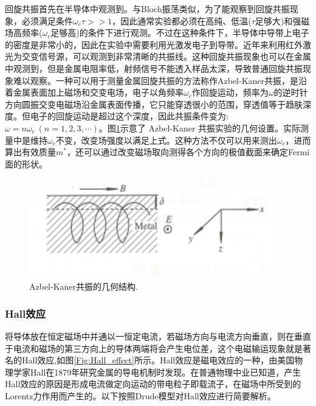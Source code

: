 回旋共振首先在半导体中观测到。与Bloch振荡类似，为了能观察到回旋共振现象，必须满足条件$\omega_c\tau>>1$，因此通常实验都必须在高纯、低温($\tau$足够大)和强磁场高频率($\omega_c$足够高)的条件下进行观测。不过在这种条件下，半导体中导带上电子的密度是非常小的，因此在实验中需要利用光激发电子到导带。近年来利用红外激光为交变信号源，可以观测到非常清晰的共振线。这种回旋共振现象也可以在金属中观测到，但是金属电阻率低，射频信号不能透入样品太深，导致普通回旋共振现象难以观察。一种可以用于测量金属回旋共振的方法称作Azbel-Kaner共振，是沿着金属表面加上磁场和交变电场，电子以角频率$\omega_c$作回旋运动，频率为$\omega$的逆时针方向圆振交变电磁场沿金属表面传播，它只能穿透很小的范围，穿透值等于趋肤深度。但电子的回旋运动是超过这个深度，因此共振条件变为:$\omega=n\omega_c~(n=1,2,3,\cdots)$。图\ref{Fig:Azbel-Kaner}示意了 Azbel-Kaner 共振实验的几何设置。实际测量中是维持$\omega_c$不变，改变场强度以满足上式。这种方法不仅可以用来测出$\omega_c$，进而算出有效质量$m^{\ast}$，还可以通过改变磁场取向测得各个方向的极值截面来确定Fermi面的形状。
\begin{figure}[h!]
\centering
\vspace*{-0.10in}
\includegraphics[height=1.70in,width=4.20in,viewport=0 0 65 25,clip]{Figures/Azbel-Kaner.png}
\caption{\small \textrm{Azbel-Kaner共振的几何结构.}}%
\label{Fig:Azbel-Kaner}
\end{figure}


\subsubsection{Hall效应} 
将导体放在恒定磁场中并通以一恒定电流，若磁场方向与电流方向垂直，则在垂直于电流和磁场的第三方向上的导体两端将会产生电位差，这个电磁输运现象就是著名的Hall效应,如图\ref{Fig:Hall_effect}所示。Hall效应是磁电效应的一种，由美国物理学家Hall在1879年研究金属的导电机制时发现。在普通物理中业已知道，产生Hall效应的原因是形成电流做定向运动的带电粒子即载流子，在磁场中所受到的Lorentz力作用而产生的。以下按照Drude模型对Hall效应进行简要解析。

